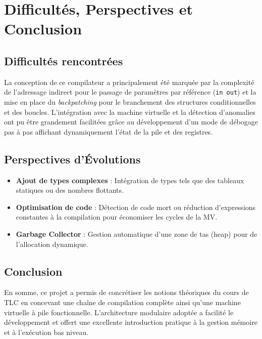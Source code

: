 \documentclass[a4paper, 12pt]{article}
\begin{document}
\newpage

\section{Difficultés, Perspectives et Conclusion}

\subsection{Difficultés rencontrées}
La conception de ce compilateur a principalement été marquée par la complexité de l'adressage indirect pour le passage de paramètres par référence (\texttt{in out}) et la mise en place du \emph{backpatching} pour le branchement des structures conditionnelles et des boucles. L'intégration avec la machine virtuelle et la détection d'anomalies ont pu être grandement facilitées grâce au développement d'un mode de débogage pas à pas affichant dynamiquement l'état de la pile et des registres.

\subsection{Perspectives d'Évolutions}
\begin{itemize}
    \item \textbf{Ajout de types complexes} : Intégration de types tels que des tableaux statiques ou des nombres flottants.
    \item \textbf{Optimisation de code} : Détection de code mort ou réduction d'expressions constantes à la compilation pour économiser les cycles de la MV.
    \item \textbf{Garbage Collector} : Gestion automatique d'une zone de tas (heap) pour de l'allocation dynamique.
\end{itemize}

\subsection{Conclusion}
En somme, ce projet a permis de concrétiser les notions théoriques du cours de TLC en concevant une chaîne de compilation complète ainsi qu'une machine virtuelle à pile fonctionnelle. L'architecture modulaire adoptée a facilité le développement et offert une excellente introduction pratique à la gestion mémoire et à l'exécution bas niveau.
\end{document}
